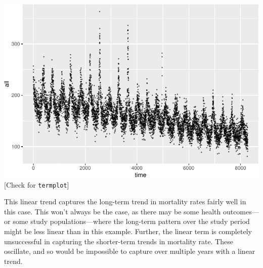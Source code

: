 \documentclass[
]{book}
\newenvironment{Shaded}{\begin{snugshade}}{\end{snugshade}}
\newcommand{\DataTypeTok}[1]{\textcolor[rgb]{0.13,0.29,0.53}{#1}}
\newcommand{\FloatTok}[1]{\textcolor[rgb]{0.00,0.00,0.81}{#1}}
\newcommand{\KeywordTok}[1]{\textcolor[rgb]{0.13,0.29,0.53}{\textbf{#1}}}
\newcommand{\NormalTok}[1]{#1}
\newcommand{\OperatorTok}[1]{\textcolor[rgb]{0.81,0.36,0.00}{\textbf{#1}}}
\newcommand{\StringTok}[1]{\textcolor[rgb]{0.31,0.60,0.02}{#1}}
\begin{document}
\begin{Shaded}
\end{Shaded}

\includegraphics{adv_epi_analysis_files/figure-latex/unnamed-chunk-46-1.pdf}
{[}Check for \texttt{termplot}{]}

This linear trend captures the long-term trend in mortality rates fairly well in
this case. This won't always be the case, as there may be some health
outcomes---or some study populations---where the long-term pattern over the
study period might be less linear than in this example. Further, the linear
term is completely unsuccessful in capturing the shorter-term trends in mortality
rate. These oscillate, and so would be impossible to capture over multiple
years with a linear trend.
\end{document}
